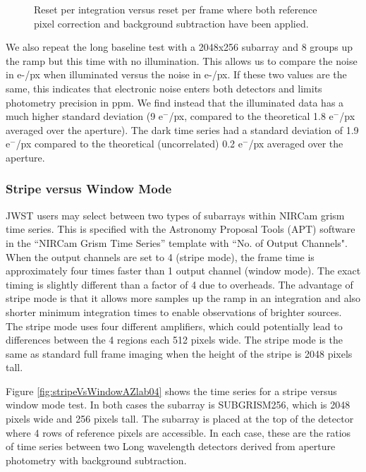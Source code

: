 \documentclass{aastex62}
\begin{document}
{\begin{figure}
{}
{}
\caption{Reset per integration versus reset per frame where both reference pixel correction and background subtraction have been applied.}\label{fig:RPFvsRPItseries}
\end{figure}

We also repeat the long baseline test with a 2048x256 subarray and 8 groups up the ramp but this time with no illumination.
This allows us to compare the noise in e-/px when illuminated versus the noise in e-/px.
If these two values are the same, this indicates that electronic noise enters both detectors and limits photometry precision in ppm.
We find instead that the illuminated data has a much higher standard deviation (9 e$^-$/px, compared to the theoretical 1.8 e$^-$/px averaged over the aperture).
The dark time series had a standard deviation of 1.9 e$^-$/px compared to the theoretical (uncorrelated) 0.2 e$^-$/px averaged over the aperture.

\clearpage

\subsubsection{Stripe versus Window Mode}
JWST users may select between two types of subarrays within NIRCam grism time series.
This is specified with the Astronomy Proposal Tools (APT) software in the ``NIRCam Grism Time Series'' template with ``No. of Output Channels".
When the output channels are set to 4 (stripe mode), the frame time is approximately four times faster than 1 output channel (window mode).
The exact timing is slightly different than a factor of 4 due to overheads.
The advantage of stripe mode is that it allows more samples up the ramp in an integration and also shorter minimum integration times to enable observations of brighter sources.
The stripe mode uses four different amplifiers, which could potentially lead to differences between the 4 regions each 512 pixels wide.
The stripe mode is the same as standard full frame imaging when the height of the stripe is 2048 pixels tall.

Figure \ref{fig:stripeVsWindowAZlab04} shows the time series for a stripe versus window mode test.
In both cases the subarray is SUBGRISM256, which is 2048 pixels wide and 256 pixels tall.
The subarray is placed at the top of the detector where 4 rows of reference pixels are accessible.
In each case, these are the ratios of time series between two Long wavelength detectors derived from aperture photometry with background subtraction.

}
\end{document}
